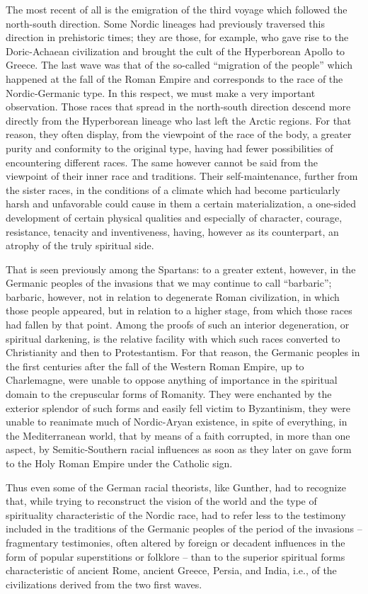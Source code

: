 The most recent of all is the emigration of the third voyage which followed the north-south direction. Some Nordic lineages had previously traversed this direction in prehistoric times; they are those, for example, who gave rise to the Doric-Achaean civilization and brought the cult of the Hyperborean Apollo to Greece. The last wave was that of the so-called ``migration of the people'' which happened at the fall of the Roman Empire and corresponds to the race of the Nordic-Germanic type. In this respect, we must make a very important observation. Those races that spread in the north-south direction descend more directly from the Hyperborean lineage who last left the Arctic regions. For that reason, they often display, from the viewpoint of the race of the body, a greater purity and conformity to the original type, having had fewer possibilities of encountering different races. The same however cannot be said from the viewpoint of their inner race and traditions. Their self-maintenance, further from the sister races, in the conditions of a climate which had become particularly harsh and unfavorable could cause in them a certain materialization, a one-sided development of certain physical qualities and especially of character, courage, resistance, tenacity and inventiveness, having, however as its counterpart, an atrophy of the truly spiritual side.

That is seen previously among the Spartans: to a greater extent, however, in the Germanic peoples of the invasions that we may continue to call ``barbaric''; barbaric, however, not in relation to degenerate Roman civilization, in which those people appeared, but in relation to a higher stage, from which those races had fallen by that point. Among the proofs of such an interior degeneration, or spiritual darkening, is the relative facility with which such races converted to Christianity and then to Protestantism. For that reason, the Germanic peoples in the first centuries after the fall of the Western Roman Empire, up to Charlemagne, were unable to oppose anything of importance in the spiritual domain to the crepuscular forms of Romanity. They were enchanted by the exterior splendor of such forms and easily fell victim to Byzantinism, they were unable to reanimate much of Nordic-Aryan existence, in spite of everything, in the Mediterranean world, that by means of a faith corrupted, in more than one aspect, by Semitic-Southern racial influences as soon as they later on gave form to the Holy Roman Empire under the Catholic sign.

Thus even some of the German racial theorists, like Gunther, had to recognize that, while trying to reconstruct the vision of the world and the type of spirituality characteristic of the Nordic race, had to refer less to the testimony included in the traditions of the Germanic peoples of the period of the invasions -- fragmentary testimonies, often altered by foreign or decadent influences in the form of popular superstitions or folklore -- than to the superior spiritual forms characteristic of ancient Rome, ancient Greece, Persia, and India, i.e., of the civilizations derived from the two first waves.

